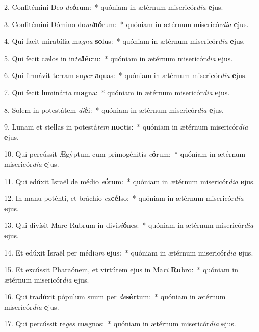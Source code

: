 2. Confitémini Deo \textit{de}\textbf{ó}rum:~*  quóniam in ætérnum misericór\textit{di}\textit{a} \textbf{e}jus.\

3. Confitémini Dómino do\textit{mi}\textbf{nó}rum:~*  quóniam in ætérnum misericór\textit{di}\textit{a} \textbf{e}jus.\

4. Qui facit mirabília ma\textit{gna} \textbf{so}lus:~*  quóniam in ætérnum misericór\textit{di}\textit{a} \textbf{e}jus.\

5. Qui fecit cælos in in\textit{tel}\textbf{léc}tu:~*  quóniam in ætérnum misericór\textit{di}\textit{a} \textbf{e}jus.\

6. Qui firmávit terram su\textit{per} \textbf{a}quas:~*  quóniam in ætérnum misericór\textit{di}\textit{a} \textbf{e}jus.\

7. Qui fecit luminári\textit{a} \textbf{ma}gna:~*  quóniam in ætérnum misericór\textit{di}\textit{a} \textbf{e}jus.\

8. Solem in potestátem \textit{di}\textbf{é}i:~*  quóniam in ætérnum misericór\textit{di}\textit{a} \textbf{e}jus.\

9. Lunam et stellas in potestá\textit{tem} \textbf{noc}tis:~*  quóniam in ætérnum misericór\textit{di}\textit{a} \textbf{e}jus.\

10. Qui percússit Ægýptum cum primogénitis \textit{e}\textbf{ó}rum:~*  quóniam in ætérnum misericór\textit{di}\textit{a} \textbf{e}jus.\

11. Qui edúxit Israël de médio \textit{e}\textbf{ó}rum:~*  quóniam in ætérnum misericór\textit{di}\textit{a} \textbf{e}jus.\

12. In manu poténti, et bráchio \textit{ex}\textbf{cél}so:~*  quóniam in ætérnum misericór\textit{di}\textit{a} \textbf{e}jus.\

13. Qui divísit Mare Rubrum in divi\textit{si}\textbf{ó}nes:~*  quóniam in ætérnum misericór\textit{di}\textit{a} \textbf{e}jus.\

14. Et edúxit Israël per médi\textit{um} \textbf{e}jus:~*  quóniam in ætérnum misericór\textit{di}\textit{a} \textbf{e}jus.\

15. Et excússit Pharaónem, et virtútem ejus in Ma\textit{ri} \textbf{Ru}bro:~*  quóniam in ætérnum misericór\textit{di}\textit{a} \textbf{e}jus.\

16. Qui tradúxit pópulum suum per \textit{de}\textbf{sér}tum:~*  quóniam in ætérnum misericór\textit{di}\textit{a} \textbf{e}jus.\

17. Qui percússit re\textit{ges} \textbf{ma}gnos:~*  quóniam in ætérnum misericór\textit{di}\textit{a} \textbf{e}jus.\

